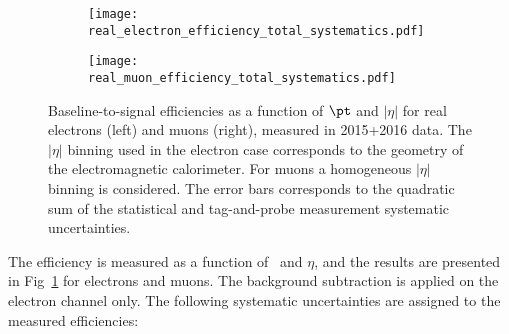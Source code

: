 \begin{figure}[t!]
\centering
\begin{subfigure}{0.49\textwidth}
\texttt{[image: real\_electron\_efficiency\_total\_systematics.pdf]}
\end{subfigure}
\begin{subfigure}{0.49\textwidth}
\texttt{[image: real\_muon\_efficiency\_total\_systematics.pdf]}
\end{subfigure}
\caption{Baseline-to-signal efficiencies as a function of $\pt$ and $|\eta|$ for real electrons (left) and muons (right), measured in 2015+2016 data.
The $|\eta|$ binning used in the electron case corresponds to the geometry of the electromagnetic calorimeter.
For muons a homogeneous $|\eta|$ binning is considered.
The error bars corresponds to the quadratic sum of the statistical and tag-and-probe measurement systematic uncertainties.}
\label{fig:prompt_leptons_eff}
\end{figure}

The efficiency is measured as a function of \pt\ and $\eta$, and the results are presented in Fig~\ref{fig:prompt_leptons_eff} for electrons and muons. 
The background subtraction is applied on the electron channel only. 
The following systematic uncertainties are assigned to the measured efficiencies: 


